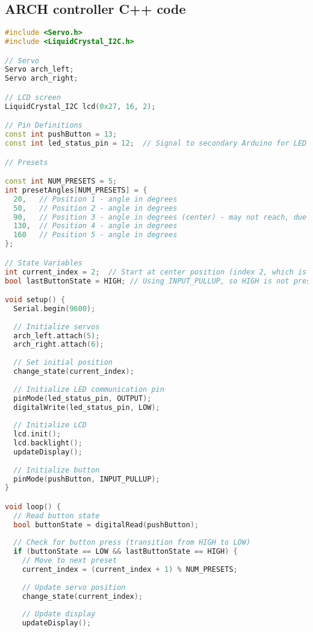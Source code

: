 \subsection{ARCH controller C++ code }
\begin{lstlisting}[style=cstyle, caption=C++ Code of the ARCH Arduino, label=lst:ArchCode, language=c++ ]
#include <Servo.h>
#include <LiquidCrystal_I2C.h>

// Servo 
Servo arch_left;
Servo arch_right;

// LCD screen
LiquidCrystal_I2C lcd(0x27, 16, 2);

// Pin Definitions
const int pushButton = 13;
const int led_status_pin = 12;  // Signal to secondary Arduino for LED control

// Presets  

const int NUM_PRESETS = 5;
int presetAngles[NUM_PRESETS] = {
  20,   // Position 1 - angle in degrees
  50,   // Position 2 - angle in degrees
  90,   // Position 3 - angle in degrees (center) - may not reach, due to servos?
  130,  // Position 4 - angle in degrees
  160   // Position 5 - angle in degrees
};

// State Variables
int current_index = 2;  // Start at center position (index 2, which is the 3rd preset)
bool lastButtonState = HIGH; // Using INPUT_PULLUP, so HIGH is not pressed

void setup() {
  Serial.begin(9600);
  
  // Initialize servos
  arch_left.attach(5);
  arch_right.attach(6);
  
  // Set initial position
  change_state(current_index);
  
  // Initialize LED communication pin
  pinMode(led_status_pin, OUTPUT);
  digitalWrite(led_status_pin, LOW);
  
  // Initialize LCD
  lcd.init();
  lcd.backlight();
  updateDisplay();
  
  // Initialize button
  pinMode(pushButton, INPUT_PULLUP);
}

void loop() {
  // Read button state
  bool buttonState = digitalRead(pushButton);
  
  // Check for button press (transition from HIGH to LOW)
  if (buttonState == LOW && lastButtonState == HIGH) {
    // Move to next preset
    current_index = (current_index + 1) % NUM_PRESETS;
    
    // Update servo position
    change_state(current_index);
    
    // Update display
    updateDisplay();
    

\end{lstlisting}
